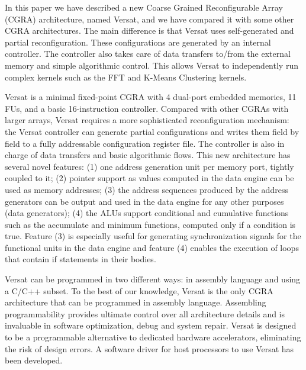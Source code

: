 \documentclass[journal]{IEEEtran}
\begin{document}
In this paper we have described a new Coarse Grained Reconfigurable
Array (CGRA) architecture, named Versat, and we have compared it with
some other CGRA architectures. The main difference is that Versat uses
self-generated and partial reconfiguration. These configurations are
generated by an internal controller. The controller also takes care of
data transfers to/from the external memory and simple algorithmic
control. This allows Versat to independently run complex kernels such
as the FFT and K-Means Clustering kernels.

Versat is a minimal fixed-point CGRA with 4 dual-port embedded
memories, 11 FUs, and a basic 16-instruction controller. Compared with
other CGRAs with larger arrays, Versat requires a more sophisticated
reconfiguration mechanism: the Versat controller can generate partial
configurations and writes them field by field to a fully addressable
configuration register file. The controller is also in charge of data
transfers and basic algorithmic flows. This new architecture has
several novel features: (1) one address generation unit per memory
port, tightly coupled to it; (2) pointer support as values computed in
the data engine can be used as memory addresses; (3) the address
sequences produced by the address generators can be output and used in
the data engine for any other purposes (data generators); (4) the ALUs
support conditional and cumulative functions such as the accumulate
and minimum functions, computed only if a condition is true. Feature
(3) is especially useful for generating synchronization signals for
the functional units in the data engine and feature (4) enables the
execution of loops that contain if statements in their bodies.

Versat can be programmed in two different ways: in assembly language
and using a C/C++ subset. To the best of our knowledge, Versat is the
only CGRA architecture that can be programmed in assembly
language. Assembling programmability provides ultimate control over
all architecture details and is invaluable in software optimization,
debug and system repair. Versat is designed to be a programmable
alternative to dedicated hardware accelerators, eliminating the risk
of design errors. A software driver for host processors to use Versat
has been developed.


\end{document}
